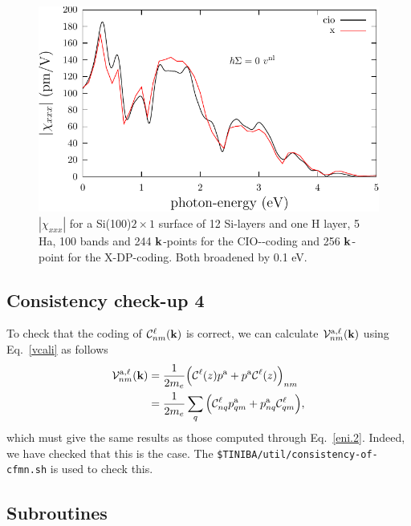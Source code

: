 \begin{figure}[b]
\centering
\includegraphics[scale=.7]{plots/shg-si-2x1-n-vs-b}
\caption{$|\chi_{xxx}|$ 
for a Si(100)$2\times 1$ surface of 12 Si-layers and one H layer, 5
Ha, 100 bands and 244 $\mathbf{k}$-points for the CIO-\tiniba-coding
and 256 $\mathbf{k}$-point for the X-DP\copyr-coding.
Both broadened by 0.1 eV.   
}
\label{si-2x1-n-vs-b}
\end{figure}

\subsection{Consistency check-up 4}

To check that the coding of 
${\mathbf{\cal C}}^\ell_{nm}(\mathbf{k})$ 
is correct, we can calculate ${\mathbf{\cal V}}^{\mathrm{a},\ell}_{nm}(\mathbf{k})$ using
Eq.~\eqref{vcali} as follows
\begin{align}\label{ccu.1}
{\mathbf{\cal V}}^{\mathrm{a},\ell}_{nm}(\mathbf{k})
&=
\frac{1}{2m_e}
\Big(
{\mathbf{\cal C}}^\ell(z)p^{\mathrm{a}}
+
p^{\mathrm{a}}{\mathbf{\cal C}}^\ell(z)
\Big)_{nm}
\nonumber\\
&=
\frac{1}{2m_e}
\sum_q
\Big(
{\mathbf{\cal C}}^\ell_{nq}p^{\mathrm{a}}_{qm}
+
p^{\mathrm{a}}_{nq}{\mathbf{\cal C}}^\ell_{qm}
\Big)
,
\end{align}
which must give the same results as those computed through
Eq.~\eqref{eni.2}.
Indeed, we have checked that this is the case. The
\verb=$TINIBA/util/consistency-of-cfmn.sh=
is used to check this.

\subsection{Subroutines}

